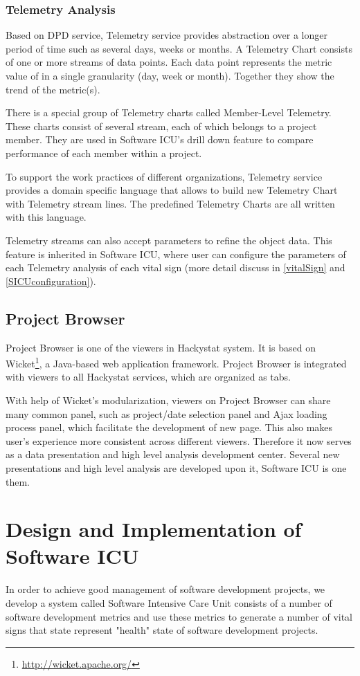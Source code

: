 \subsection{Telemetry Analysis}
Based on DPD service, Telemetry service provides abstraction over a longer period of time such as several days, weeks or months. A Telemetry Chart consists of one or more streams of data points. Each data point represents the metric value of in a single granularity (day, week or month). Together they show the trend of the metric(s).

There is a special group of Telemetry charts called Member-Level Telemetry. These charts consist of several stream, each of which belongs to a project member. They are used in Software ICU's drill down feature to compare performance of each member within a project. 

To support the work practices of different organizations, Telemetry service provides a domain specific language that allows to build new Telemetry Chart with Telemetry stream lines. The predefined Telemetry Charts are all written with this language.

Telemetry streams can also accept parameters to refine the object data. This feature is inherited in Software ICU, where user can configure the parameters of each Telemetry analysis of each vital sign (more detail discuss in \autoref{vitalSign} and \autoref{SICUconfiguration}).

\section {Project Browser}
Project Browser is one of the viewers in Hackystat system. It is based on Wicket\footnote{\url{http://wicket.apache.org/}}, a Java-based web application framework. Project Browser is integrated with viewers to all Hackystat services, which are organized as tabs. 

With help of Wicket's modularization, viewers on Project Browser can share many common panel, such as project/date selection panel and Ajax loading process panel, which facilitate the development of new page. This also makes user's experience more consistent across different viewers. Therefore it now serves as a data presentation and high level analysis development center. Several new presentations and high level analysis are developed upon it, Software ICU is one them.

\chapter{Design and Implementation of Software ICU}
In order to achieve good management of software development projects, we develop a system called Software Intensive Care Unit consists of a number of software development metrics and use these metrics to generate a number of vital signs that state represent "health" state of software development projects.

